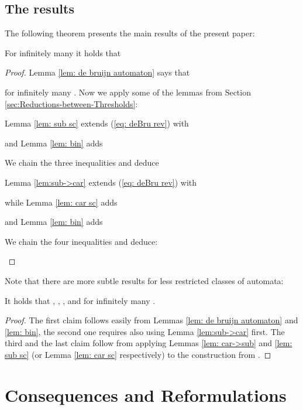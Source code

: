 \documentclass{ws-ijmpc}
\begin{document}
\subsection{The results}

The following theorem presents the main results of the present paper:
\begin{theorem}
\label{thm: main}For infinitely many  it holds that\end{theorem}
\begin{romanlist}
\item 
\item \end{romanlist}
\begin{proof}
Lemma \ref{lem: de bruijn automaton} says that

for infinitely many . Now we apply some of the lemmas from
Section \ref{sec:Reductions-between-Thresholds}:
\begin{romanlist}
\item Lemma \ref{lem: sub sc} extends (\ref{eq: deBru rev}) with

and Lemma \ref{lem: bin} adds

We chain the three inequalities and deduce


\item Lemma \ref{lem:sub->car} extends (\ref{eq: deBru rev}) with

while Lemma \ref{lem: car sc} adds 

and Lemma \ref{lem: bin} adds

We chain the four inequalities and deduce:


\end{romanlist}
\end{proof}
Note that there are more subtle results for less restricted classes
of automata:
\begin{proposition}
It holds that ,
, ,
and  for infinitely
many .\end{proposition}
\begin{proof}
The first claim follows easily from Lemmas \ref{lem: de bruijn automaton}
and \ref{lem: bin}, the second one requires also using Lemma \ref{lem:sub->car}
first. The third and the last claim follow from applying Lemmas \ref{lem: car->sub}
and \ref{lem: sub sc} (or Lemma \ref{lem: car sc} respectively)
to the construction from \citep{MAR6}.
\end{proof}

\section{Consequences and Reformulations\label{sec:Consequences-and-reformulations}}
\end{document}

